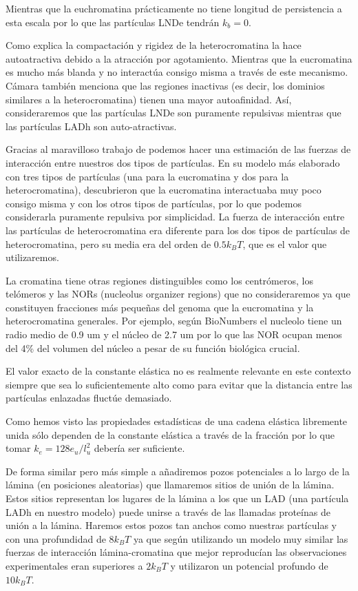 Mientras que la euchromatina prácticamente no tiene longitud de persistencia a esta escala por lo que las partículas LNDe tendrán $k_b=0$.

Como explica \cite{Camara2023} la compactación y rigidez de la heterocromatina la hace autoatractiva debido a la atracción por agotamiento. Mientras que la eucromatina es mucho más blanda y no interactúa consigo misma a través de este mecanismo. Cámara también menciona que las regiones inactivas (es decir, los dominios similares a la heterocromatina) tienen una mayor autoafinidad. Así, consideraremos que las partículas LNDe son puramente repulsivas mientras que las partículas LADh son auto-atractivas.

Gracias al maravilloso trabajo de \cite{Falk2019} podemos hacer una estimación de las fuerzas de interacción entre nuestros dos tipos de partículas. En su modelo más elaborado con tres tipos de partículas (una para la eucromatina y dos para la heterocromatina), descubrieron que la eucromatina interactuaba muy poco consigo misma y con los otros tipos de partículas, por lo que podemos considerarla puramente repulsiva por simplicidad. La fuerza de interacción entre las partículas de heterocromatina era diferente para los dos tipos de partículas de heterocromatina, pero su media era del orden de $0.5k_BT$, que es el valor que utilizaremos.

La cromatina tiene otras regiones distinguibles como los centrómeros, los telómeros y las NORs (nucleolus organizer regions) que no consideraremos ya que constituyen fracciones más pequeñas del genoma que la eucromatina y la heterocromatina generales. Por ejemplo, según BioNumbers el nucleolo tiene un radio medio de 0.9 $\text{um}$ y el núcleo de 2.7 $\text{um}$ por lo que las NOR ocupan menos del 4\% del volumen del núcleo a pesar de su función biológica crucial.

El valor exacto de la constante elástica no es realmente relevante en este contexto siempre que sea lo suficientemente alto como para evitar que la distancia entre las partículas enlazadas fluctúe demasiado.

Como hemos visto las propiedades estadísticas de una cadena elástica libremente unida sólo dependen de la constante elástica a través de la fracción por lo que tomar $k_e=128e_u/l_u^2$ debería ser suficiente.

De forma similar pero más simple a \cite{Bajpai2021} añadiremos pozos potenciales a lo largo de la lámina (en posiciones aleatorias) que llamaremos sitios de unión de la lámina. Estos sitios representan los lugares de la lámina a los que un LAD (una partícula LADh en nuestro modelo) puede unirse a través de las llamadas proteínas de unión a la lámina. Haremos estos pozos tan anchos como nuestras partículas y con una profundidad de $8k_BT$ ya que según \cite{Maji2020} utilizando un modelo muy similar las fuerzas de interacción lámina-cromatina que mejor reproducían las observaciones experimentales eran superiores a $2k_BT$ y \cite{Bajpai2021} utilizaron un potencial profundo de $10k_BT$.

